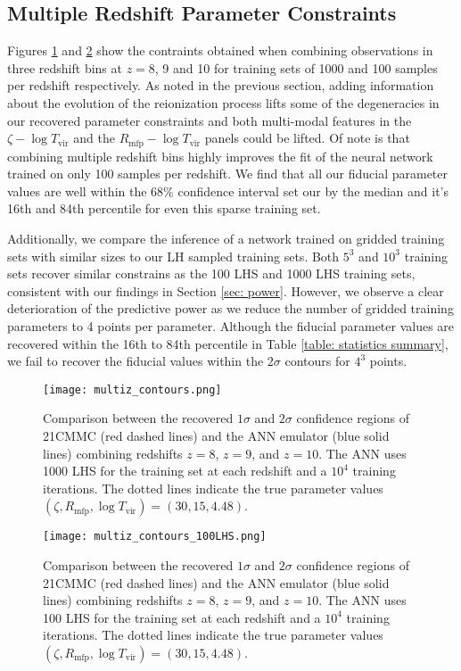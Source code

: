 \documentclass[useAMS,usenatbib]{mnras}
\begin{document}
\subsection{Multiple Redshift Parameter Constraints}

Figures \ref{fig: mcmc 1000LHS multi} and \ref{fig: mcmc 100LHS multi} show the contraints obtained when combining observations in three redshift bins at $z = 8$, 9 and 10 for training sets of 1000 and 100 samples per redshift respectively.
As noted in the previous section, adding information about the evolution of the reionization process lifts some of the degeneracies in our recovered parameter constraints and both multi-modal features in the $\zeta - \log T_\text{vir}$ and the  $R_\text{mfp} - \log T_\text{vir}$ panels could be lifted.
Of note is that combining multiple redshift bins highly improves the fit of the neural network trained on only 100 samples per redshift.
We find that all our fiducial parameter values are well within the 68\% confidence interval set our by the median and it's 16th and 84th percentile for even this sparse training set.

Additionally, we compare the inference of a network trained on gridded training sets with similar sizes to our LH sampled training sets. 
Both $5^3$ and $10^3$ training sets recover similar constrains as the 100 LHS and 1000 LHS training sets, consistent with our findings in Section \ref{sec: power}.
However, we observe a clear deterioration of the predictive power as we reduce the number of gridded training parameters to 4 points per parameter. 
Although the fiducial parameter values are recovered within the 16th to 84th percentile in Table \ref{table: statistics summary}, we fail to recover the fiducial values within the $2\sigma$ contours for $4^3$ points.

\begin{figure}
\texttt{[image: multiz\_contours.png]}
\caption{Comparison between the recovered $1\sigma$ and $2\sigma$ confidence regions of 21CMMC (red dashed lines) and the ANN emulator (blue solid lines) combining redshifts $z = 8$, $z = 9$, and $z = 10$. The ANN uses 1000 LHS for the training set at each redshift and a $10^4$ training iterations. The dotted lines indicate the true parameter values $(\zeta, R_\text{mfp}, \log T_\text{vir}) = (30, 15, 4.48)$.}
\label{fig: mcmc 1000LHS multi}
\end{figure}

\begin{figure}
\texttt{[image: multiz\_contours\_100LHS.png]}
\caption{Comparison between the recovered $1\sigma$ and $2\sigma$ confidence regions of 21CMMC (red dashed lines) and the ANN emulator (blue solid lines) combining redshifts $z = 8$, $z = 9$, and $z = 10$. The ANN uses 100 LHS for the training set at each redshift and a $10^4$ training iterations. The dotted lines indicate the true parameter values $(\zeta, R_\text{mfp}, \log T_\text{vir}) = (30, 15, 4.48)$.}
\label{fig: mcmc 100LHS multi}
\end{figure}
\end{document}
